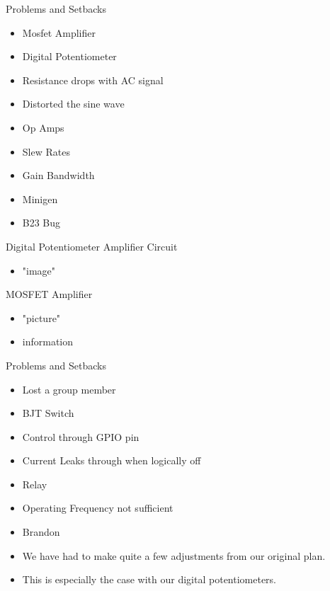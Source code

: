\begin{frame}{Problems and Setbacks}
  \begin{itemize}
    \item Mosfet Amplifier
    \item Digital Potentiometer
    \item Resistance drops with AC signal
    \item Distorted the sine wave
    \item Op Amps
    \item Slew Rates
    \item Gain Bandwidth
    \item Minigen
    \item B23 Bug
  \end{itemize}
\end{frame}

\begin{frame}{Digital Potentiometer Amplifier Circuit }
  \begin{itemize}
    \item "image"
  \end{itemize}
\end{frame}

\begin{frame}{MOSFET Amplifier}
  \begin{itemize}
    \item "picture"
    \item information
  \end{itemize}
\end{frame}

\begin{frame}{Problems and Setbacks}
  \begin{itemize}
    \item Lost a group member
    \item BJT Switch
    \item Control through GPIO pin
    \item Current Leaks through when logically off
    \item Relay
    \item Operating Frequency not sufficient
    \item Brandon
    \item We have had to make quite a few adjustments from our original plan.
    \item This is especially the case with our digital potentiometers.
  \end{itemize}
\end{frame}

